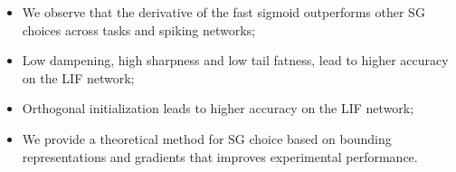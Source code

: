 \begin{itemize}
    \itemsep0em 
    \item We observe that the derivative of the fast sigmoid outperforms other SG choices across tasks and spiking networks;
    \item Low dampening, high sharpness and low tail fatness, lead to higher accuracy on the LIF network;
    \item Orthogonal initialization  leads to higher accuracy on the LIF network;
    \item We provide a theoretical method for SG choice based on bounding representations and gradients that improves experimental performance.
\end{itemize}
